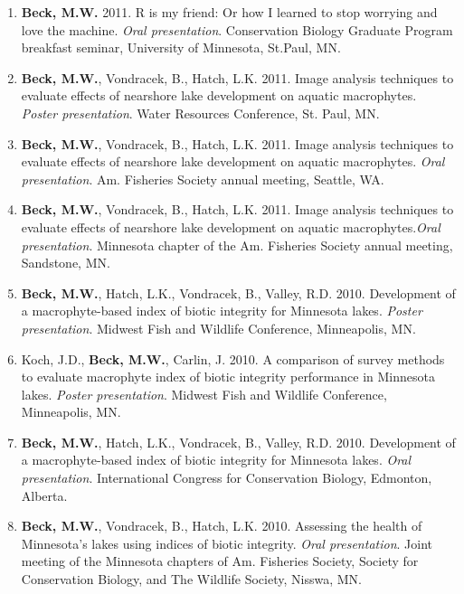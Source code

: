 \documentclass[letterpaper,12pt]{article}
\begin{document}
\begin{enumerate}
\item {\bf Beck, M.W.} 2011. R is my friend: Or how I learned to stop worrying and love the machine. \textit{Oral presentation}. Conservation Biology Graduate Program breakfast seminar, University of Minnesota, St.Paul, MN.

\item {\bf Beck, M.W.}, Vondracek, B., Hatch, L.K. 2011. Image analysis techniques to evaluate effects of nearshore lake development on aquatic macrophytes. \textit{Poster presentation}. Water Resources Conference, St. Paul, MN.

\item {\bf Beck, M.W.}, Vondracek, B., Hatch, L.K. 2011. Image analysis techniques to evaluate effects of nearshore lake development on aquatic macrophytes. \textit{Oral presentation}. Am. Fisheries Society annual meeting, Seattle, WA.

\item {\bf Beck, M.W.}, Vondracek, B., Hatch, L.K. 2011. Image analysis techniques to evaluate effects of nearshore lake development on aquatic macrophytes.\textit{Oral presentation}. Minnesota chapter of the Am. Fisheries Society annual meeting, Sandstone, MN.

\item {\bf Beck, M.W.}, Hatch, L.K., Vondracek, B., Valley, R.D. 2010. Development of a macrophyte-based index of biotic integrity for Minnesota lakes. \textit{Poster presentation}. Midwest Fish and Wildlife Conference, Minneapolis, MN.

\item Koch, J.D., {\bf Beck, M.W.}, Carlin, J. 2010. A comparison of survey methods to evaluate macrophyte index of biotic integrity performance in Minnesota lakes. \textit{Poster presentation}. Midwest Fish and Wildlife Conference, Minneapolis, MN.

\item {\bf Beck, M.W.}, Hatch, L.K., Vondracek, B., Valley, R.D. 2010. Development of a macrophyte-based index of biotic integrity for Minnesota lakes. \textit{Oral presentation}. International Congress for Conservation Biology, Edmonton, Alberta.

\item {\bf Beck, M.W.}, Vondracek, B., Hatch, L.K. 2010. Assessing the health of Minnesota's lakes using indices of biotic integrity. \textit{Oral presentation}. Joint meeting of the Minnesota chapters of Am. Fisheries Society, Society for Conservation Biology, and The Wildlife Society, Nisswa, MN.


\end{enumerate}
\end{document}
